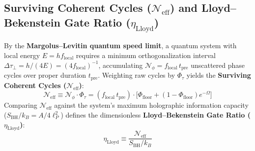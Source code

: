 \documentclass[11pt,a4paper]{article}
\begin{document}
\subsection{Surviving Coherent Cycles ($\mathcal{N}_{\mathrm{eff}}$) and Lloyd--Bekenstein Gate Ratio ($\eta_{\mathrm{Lloyd}}$)}
By the \textbf{Margolus--Levitin quantum speed limit}, a quantum system with local energy $E = h f_{\mathrm{local}}$ requires a minimum orthogonalization interval $\Delta\tau_\perp = h / (4E) = (4 f_{\mathrm{local}})^{-1}$, accumulating $\mathcal{N}_\phi = f_{\mathrm{local}}\,t_{\mathrm{pre}}$ unscattered phase cycles over proper duration $t_{\mathrm{pre}}$. Weighting raw cycles by $\Phi_\tau$ yields the \textbf{Surviving Coherent Cycles ($\mathcal{N}_{\mathrm{eff}}$)}:
\begin{equation}
\mathcal{N}_{\mathrm{eff}} \equiv \mathcal{N}_\phi \cdot \Phi_\tau = (f_{\mathrm{local}}\,t_{\mathrm{pre}}) \cdot \big[\Phi_{\mathrm{floor}} + (1 - \Phi_{\mathrm{floor}})e^{-\Omega}\big]
\end{equation}
Comparing $\mathcal{N}_{\mathrm{eff}}$ against the system's maximum holographic information capacity ($S_{\mathrm{BH}} / k_B = A / 4\ell_P^2$) defines the dimensionless \textbf{Lloyd--Bekenstein Gate Ratio ($\eta_{\mathrm{Lloyd}}$)}:
\begin{equation}
\eta_{\mathrm{Lloyd}} \equiv \frac{\mathcal{N}_{\mathrm{eff}}}{S_{\mathrm{BH}} / k_B}
\end{equation}
\end{document}
